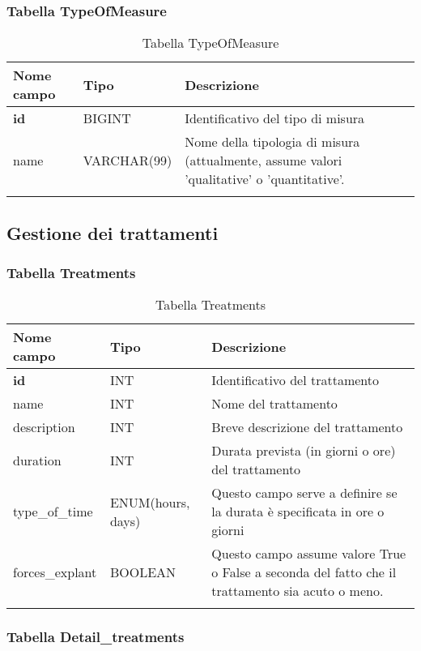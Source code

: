 \subsubsection{Tabella TypeOfMeasure}

\begin{longtable}{|l|l|p{6.5cm}|}
\hline
\textbf{Nome campo} &	\textbf{Tipo} &	\textbf{Descrizione}\\ \hline
\textbf{id} &	BIGINT &	Identificativo del tipo di misura\\ \hline
name &	VARCHAR(99) &	Nome della tipologia di misura (attualmente, assume valori 'qualitative' o 'quantitative'.\\ \hline
\caption{Tabella TypeOfMeasure}
\end{longtable}

\subsection{Gestione dei trattamenti}

\subsubsection{Tabella Treatments}

\begin{longtable}{|l|l|p{5.5cm}|}
\hline
\textbf{Nome campo} & \textbf{Tipo} & \textbf{Descrizione}\\ \hline
\textbf{id} & INT & Identificativo del trattamento\\ \hline
name	 & INT & 	Nome del trattamento\\ \hline
description & INT & Breve descrizione del trattamento\\ \hline
duration	& INT & Durata prevista (in giorni o ore) del trattamento\\ \hline
type\_of\_time & ENUM(hours, days) & Questo campo serve a definire se la durata \`e specificata in ore o giorni\\ \hline
forces\_explant & BOOLEAN & Questo campo assume valore True o False a seconda del fatto che il trattamento sia acuto o meno.\\ \hline
\caption{Tabella Treatments}
\end{longtable}

\subsubsection{Tabella Detail\_treatments}

